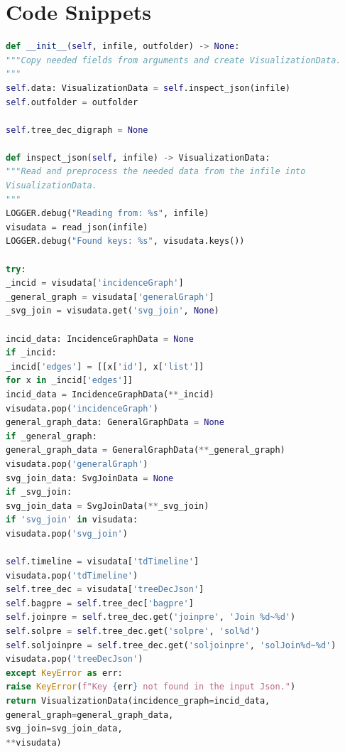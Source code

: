 \documentclass[a4paper, 12pt, bibliography=totoc]{scrartcl}
\begin{document}
\newpage
\section{Code Snippets}




\begin{lstlisting}[language={Python}, caption={Initializing a Visualization object}, label={lst:visuinit}]
def __init__(self, infile, outfolder) -> None:
"""Copy needed fields from arguments and create VisualizationData.
"""
self.data: VisualizationData = self.inspect_json(infile)
self.outfolder = outfolder

self.tree_dec_digraph = None

def inspect_json(self, infile) -> VisualizationData:
"""Read and preprocess the needed data from the infile into 
VisualizationData.
"""
LOGGER.debug("Reading from: %s", infile)
visudata = read_json(infile)
LOGGER.debug("Found keys: %s", visudata.keys())

try:
_incid = visudata['incidenceGraph']
_general_graph = visudata['generalGraph']
_svg_join = visudata.get('svg_join', None)

incid_data: IncidenceGraphData = None
if _incid:
_incid['edges'] = [[x['id'], x['list']]
for x in _incid['edges']]
incid_data = IncidenceGraphData(**_incid)
visudata.pop('incidenceGraph')
general_graph_data: GeneralGraphData = None
if _general_graph:
general_graph_data = GeneralGraphData(**_general_graph)
visudata.pop('generalGraph')
svg_join_data: SvgJoinData = None
if _svg_join:
svg_join_data = SvgJoinData(**_svg_join)
if 'svg_join' in visudata:
visudata.pop('svg_join')

self.timeline = visudata['tdTimeline']
visudata.pop('tdTimeline')
self.tree_dec = visudata['treeDecJson']
self.bagpre = self.tree_dec['bagpre']
self.joinpre = self.tree_dec.get('joinpre', 'Join %d~%d')
self.solpre = self.tree_dec.get('solpre', 'sol%d')
self.soljoinpre = self.tree_dec.get('soljoinpre', 'solJoin%d~%d')
visudata.pop('treeDecJson')
except KeyError as err:
raise KeyError(f"Key {err} not found in the input Json.")
return VisualizationData(incidence_graph=incid_data,
general_graph=general_graph_data,
svg_join=svg_join_data,
**visudata)

\end{lstlisting}
\end{document}
